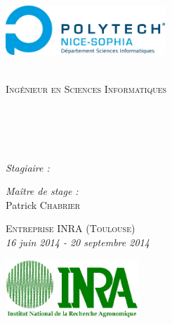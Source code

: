 \begin{titlepage}
\begin{center}
\begin{minipage}[t]{0.49\textwidth}
\begin{flushleft}
  \end{flushleft}
\end{minipage} 
\begin{minipage}[t]{0.49\textwidth}
  \begin{flushright}
    \includegraphics [width=60mm]{images/Logo_polytech_SI.jpg} \\[0.2cm]
  \end{flushright}
\end{minipage} \\[2.0cm]
\vspace*{-0.8cm}
\textsc{\Large Ingénieur en Sciences Informatiques}\\[0.5cm]
\textsc{\Large \reportsubject}\\[0.5cm]
\HRule \\[0.4cm]
{\huge \bfseries \reporttitle}\\[0.4cm]
\HRule \\[1.5cm]
\vspace*{-0.8cm}
\begin{minipage}[t]{0.64\textwidth}
  \begin{flushleft} \large
    \emph{Stagiaire :}\\
    \reportauthor
  \end{flushleft}
\end{minipage}
\begin{minipage}[t]{0.35\textwidth}
  \begin{flushleft} \large
    \emph{Maître de stage :} \\
    Patrick \textsc{Chabrier}
  \end{flushleft}
  \vspace*{1.0cm}
\end{minipage}
\textsc{\Large Entreprise INRA (Toulouse)}\\[0.5cm]
{\emph{16 juin 2014 - 20 septembre 2014}}\\
\vfill

\includegraphics [width=50mm]{images/logoINRA.jpg} \\[0.6cm]
\end{center}

\end{titlepage}
